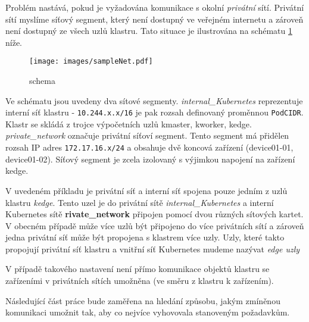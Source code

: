 Problém nastává, pokud je vyžadována komunikace s okolní \textit{privátní} sítí. Privátní sítí myslíme síťový segment, který není dostupný ve veřejném internetu a zároveň není dostupný ze všech uzlů klastru. Tato situace je ilustrována na schématu \ref{fig:schema} níže.

\begin{figure}[!ht]
    \centering
    \texttt{[image: images/sampleNet.pdf]}
    \caption{schema}
    \label{fig:schema}
\end{figure}

Ve schématu jsou uvedeny dva sítové segmenty. \textit{internal\_Kubernetes} reprezentuje interní síť klastru - \verb|10.244.x.x/16| je pak rozsah definovaný proměnnou \verb|PodCIDR|. Klastr se skládá z trojce výpočetních uzlů kmaster, kworker, kedge. \textit{private\_network} označuje privátní síťoví segment. Tento segment má přidělen rozsah IP adres \verb|172.17.16.x/24| a obsahuje dvě koncová zařízení (device01-01, device01-02). Síťový segment je zcela izolovaný s výjimkou napojení na zařízení kedge.

V uvedeném příkladu je privátní síť a interní síť spojena pouze jedním z uzlů klastru \textit{kedge}. Tento uzel je do privátní sítě \textit{internal\_Kubernetes} a interní Kubernetes sítě \textbf{rivate\_network} připojen pomocí dvou různých sítových kartet. V obecném případě může více uzlů být připojeno do více privátních sítí a zároveň jedna privátní síť může být propojena s klastrem více uzly. Uzly, které takto propojují privátní síť klastru a vnitřní síť Kubernetes mudeme nazývat \textit{edge uzly}

V případě takového nastavení není přímo komunikace objektů klastru se zařízeními v privátních sítích umožněna (ve směru z klastru k zařízením).

Následující část práce bude zaměřena na hledání způsobu, jakým zmíněnou komunikaci umožnit tak, aby co nejvíce vyhovovala stanoveným požadavkům.

